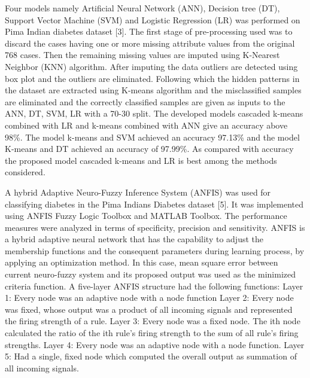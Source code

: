 Four models namely Artificial Neural Network (ANN), Decision tree (DT), Support Vector Machine (SVM) and Logistic Regression (LR) was performed on Pima Indian diabetes dataset [3]. The first stage of pre-processing used was to discard the cases having one or more missing attribute values from the original 768 cases. Then the remaining missing values are imputed using K-Nearest Neighbor (KNN) algorithm. After imputing the data outliers are detected using box plot and the outliers are eliminated. Following which the hidden patterns in the dataset are extracted using K-means algorithm and the misclassified samples are eliminated and the correctly classified samples are given as inputs to the ANN, DT, SVM, LR with a 70-30 split. The developed models cascaded k-means combined with LR and k-means combined with ANN give an accuracy above 98\%. The model k-means and SVM achieved an accuracy 97.13\% and the model K-means and DT achieved an accuracy of 97.99\%. As compared with accuracy the proposed model cascaded k-means and LR is best among the methods considered. \par \noindent   
A hybrid Adaptive Neuro-Fuzzy Inference System (ANFIS) was used for classifying diabetes in the Pima Indians Diabetes dataset [5]. It was implemented using ANFIS Fuzzy Logic Toolbox and MATLAB Toolbox. The performance measures were analyzed in terms of specificity, precision and sensitivity.
ANFIS is a hybrid adaptive neural network that has the capability to adjust the membership functions and the consequent parameters during learning process, by applying an optimization method. In this case, mean square error between current neuro-fuzzy system and its proposed output was used as the minimized criteria function.
A five-layer ANFIS structure had the following functions:\newline
Layer 1: Every node was an adaptive node with a node function \newline
Layer 2: Every node was fixed, whose output was a product of all incoming signals and represented the firing strength of a rule. \newline
Layer 3: Every node was a fixed node. The ith node calculated the ratio of the ith rule’s firing strength to the sum of all rule’s firing strengths. \newline
Layer 4: Every node was an adaptive node with a node function. \newline
Layer 5: Had a single, fixed node which computed the overall output as summation of all incoming signals. \newline
